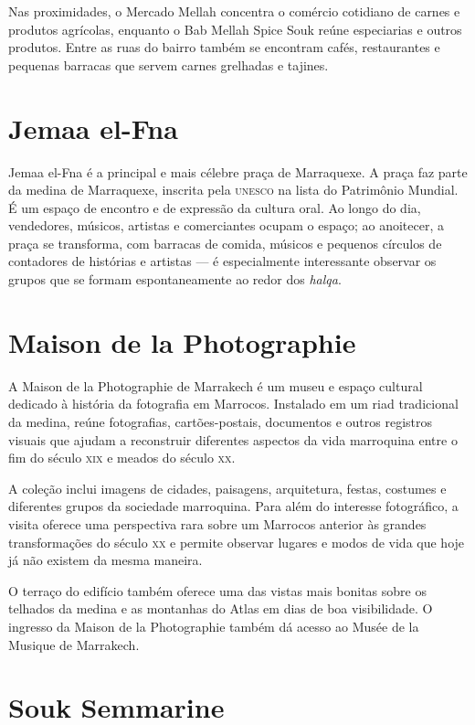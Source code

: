 Nas proximidades, o Mercado Mellah concentra o comércio cotidiano de carnes e produtos agrícolas, enquanto o Bab Mellah Spice Souk reúne especiarias e outros produtos. Entre as ruas do bairro também se encontram cafés, restaurantes e pequenas barracas que servem carnes grelhadas e tajines.

\chapter{Jemaa el-Fna}

Jemaa el-Fna é a principal e mais célebre praça de Marraquexe. A praça faz parte da medina de Marraquexe, inscrita pela \textsc{unesco} na lista do Patrimônio Mundial. É um espaço de encontro e de expressão da cultura oral. Ao longo do dia, vendedores, músicos, artistas e comerciantes ocupam o espaço; ao anoitecer, a praça se transforma, com barracas de comida, músicos e pequenos círculos de contadores de histórias e artistas --- é especialmente interessante observar os grupos que se formam espontaneamente ao redor dos \textit{halqa}.

\chapter{Maison de la Photographie}

A Maison de la Photographie de Marrakech é um museu e espaço cultural dedicado à história da fotografia em Marrocos. Instalado em um riad tradicional da medina, reúne fotografias, cartões-postais, documentos e outros registros visuais que ajudam a reconstruir diferentes aspectos da vida marroquina entre o fim do século \textsc{xix} e meados do século \textsc{xx}.

A coleção inclui imagens de cidades, paisagens, arquitetura, festas, costumes e diferentes grupos da sociedade marroquina. Para além do interesse fotográfico, a visita oferece uma perspectiva rara sobre um Marrocos anterior às grandes transformações do século \textsc{xx} e permite observar lugares e modos de vida que hoje já não existem da mesma maneira.

O terraço do edifício também oferece uma das vistas mais bonitas sobre os telhados da medina e as montanhas do Atlas em dias de boa visibilidade. O ingresso da Maison de la Photographie também dá acesso ao Musée de la Musique de Marrakech.

\chapter{Souk Semmarine}

